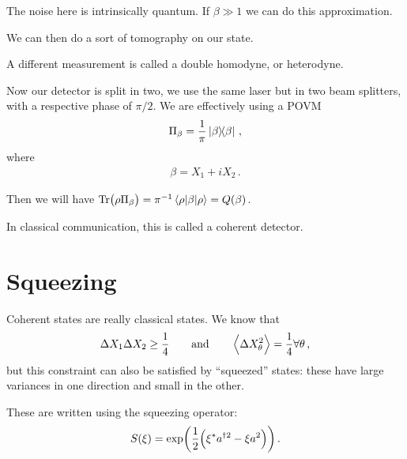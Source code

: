 \documentclass[main.tex]{subfiles}
\begin{document}
The noise here is intrinsically quantum. 
If \(\beta \gg 1 \) we can do this approximation. 

We can then do a sort of tomography on our state. 

A different measurement is called a double homodyne, or heterodyne. 

Now our detector is split in two, we use the same laser but in two beam splitters, with a respective phase of \(\pi / 2\). We are effectively using a POVM 
%
\begin{align}
\Pi_{\beta } = \frac{1}{\pi } \dyad{\beta }
\,,
\end{align}
%
where 
%
\begin{align}
\beta = X_1 + i X_2 
\,.
\end{align}

Then we will have \(\Tr (\rho \Pi_{\beta }) = \pi^{-1} \ev{\beta }{\rho } = Q(\beta )\). 

In classical communication, this is called a coherent detector. 

\section{Squeezing}

Coherent states are really classical states. 
We know that 
%
\begin{align}
\Delta X_1 \Delta X_2 \geq \frac{1}{4} 
\qquad \text{and} \qquad
\expval{ \Delta X^2_{\theta }} = \frac{1}{4} \forall \theta 
\,,
\end{align}
%
but this constraint can also be satisfied by ``squeezed'' states: these have large variances in one direction and small in the other. 

These are written using the squeezing operator: 
%
\begin{align}
S(\xi ) = \exp( \frac{1}{2} \qty(\xi^{*} a ^{\dag 2} - \xi a^2))
\,.
\end{align}
\end{document}
